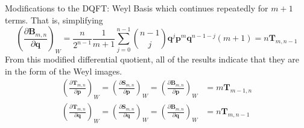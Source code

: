 \documentclass[aspectratio=169]{beamer}
\begin{document}
\begin{frame}[allowframebreaks]{Modifications to the DQFT: Weyl Basis}
		\framebreak
		which continues repeatedly for $m+1$ terms. That is, simplifying
		\begin{equation}
			\left( \frac{\partial\textbf{B}_{m,n}}{\partial\textbf{q}}\right)_W=\frac{n}{2^{n-1}}\frac{1}{m+1}\sum_{j=0}^{n-1}\binom{n-1}{j}\textbf{q}^j\textbf{p}^m\textbf{q}^{n-1-j}(m+1)=n\textbf{T}_{m,n-1}
		\end{equation}
		From this modified differential quotient, all of the results indicate that they are in the form of the Weyl images.
		\begin{eqnarray}
			\left( \frac{\partial\textbf{T}_{m,n}}{\partial\textbf{p}}\right)_W=\left( \frac{\partial\textbf{S}_{m,n}}{\partial\textbf{p}}\right)_W=\left( \frac{\partial\textbf{B}_{m,n}}{\partial\textbf{p}}\right)_W&=m\textbf{T}_{m-1,n} \\
			\left( \frac{\partial\textbf{T}_{m,n}}{\partial\textbf{q}}\right)_W=\left( \frac{\partial\textbf{S}_{m,n}}{\partial\textbf{q}}\right)_W=\left( \frac{\partial\textbf{B}_{m,n}}{\partial\textbf{q}}\right)_W&=n\textbf{T}_{m,n-1}
		\end{eqnarray}
	\end{frame}
	
\end{document}
